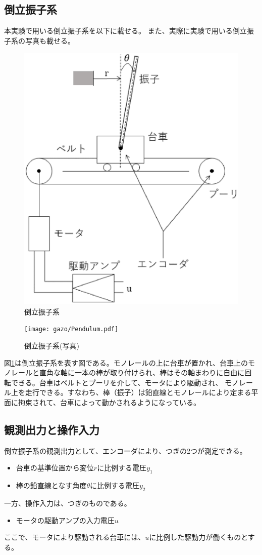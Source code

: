 \subsection{倒立振子系}
本実験で用いる倒立振子系を以下に載せる。
また、実際に実験で用いる倒立振子系の写真も載せる。
\begin{figure}[H]
	\centering
	\includegraphics[width=0.6\linewidth]{gazo/pendulum.eps}
	\caption{倒立振子系}
	\label{image:pendulum}
\end{figure}
\begin{figure}[H]
	\centering
	\texttt{[image: gazo/Pendulum.pdf]}
	\caption{倒立振子系(写真)}
	\label{image:pendulum_photo}
\end{figure}
図\ref{image:pendulum}は倒立振子系を表す図である。モノレールの上に台車が置かれ、台車上のモノレールと直角な軸に一本の棒が取り付けられ、棒はその軸まわりに自由に回転できる。台車はベルトとプーリを介して、モータにより駆動され、
モノレール上を走行できる。すなわち、棒（振子）は鉛直線とモノレールにより定まる平面に拘束されて、台車によって動かされるようになっている。\\
\subsection{観測出力と操作入力}
倒立振子系の観測出力として、エンコーダにより、つぎの2つが測定できる。\\
\begin{itemize}
  \item 台車の基準位置から変位$r$に比例する電圧$y_{1}$
  \item 棒の鉛直線となす角度$\theta$に比例する電圧$y_{2}$
\end{itemize}
一方、操作入力は、つぎのものである。
\begin{itemize}
  \item モータの駆動アンプの入力電圧$u$
\end{itemize}
ここで、モータにより駆動される台車には、$u$に比例した駆動力が働くものとする。


